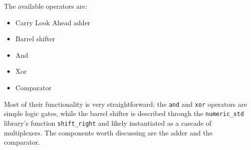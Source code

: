 The available operators are:
\begin{itemize}
    \item Carry Look Ahead adder
    \item Barrel shifter
    \item And
    \item Xor
    \item Comparator
\end{itemize}

Most of their functionality is very straightforward: the \texttt{and} and \texttt{xor} operators are simple logic gates,
while the barrel shifter is described through the \texttt{numeric\_std} library's function \texttt{shift\_right} and
likely instantiated as a cascade of multiplexers. The components worth discussing are the adder and the comparator.

